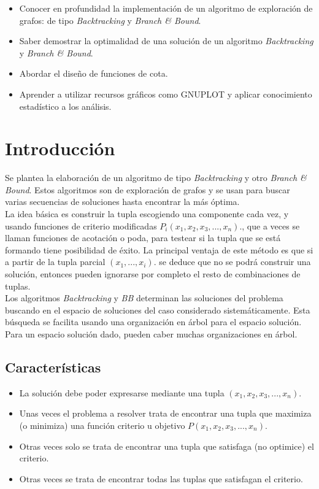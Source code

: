 \documentclass[a4paper,12pt,twoside]{article} %
\begin{document}
	\begin{itemize}
		\item Conocer en profundidad la implementación de un algoritmo de exploración de grafos: de tipo \textit{Backtracking} y \textit{Branch \& Bound}.
		\item Saber demostrar la optimalidad de una solución de un algoritmo \textit{Backtracking} y \textit{Branch \& Bound}.
		\item Abordar el diseño de funciones de cota.
		\item Aprender a utilizar recursos gráficos como GNUPLOT y aplicar conocimiento estadístico a los análisis.
	\end{itemize}
\newpage


\section{Introducción}

Se plantea la elaboración de un algoritmo de tipo \textit{Backtracking} y otro \textit{Branch \& Bound}. Estos algoritmos son de exploración de grafos y se usan para buscar varias secuencias de soluciones hasta encontrar la más óptima.\\

La idea básica es construir la tupla escogiendo
una componente cada vez, y usando funciones de criterio modificadas
$P_i(x_1,x_2,x_3,...,x_n)$., que a veces se llaman funciones de acotación o poda, para testear si la tupla que se está formando tiene posibilidad de éxito. La principal ventaja de este método es que si a partir de la tupla parcial $(x_1,...,x_i)$. se deduce que no se podrá construir una solución, entonces pueden ignorarse por completo el resto de combinaciones de tuplas.\\

Los algoritmos \textit{Backtracking} y \textit{BB} determinan las soluciones del problema buscando en el espacio de soluciones del caso considerado sistemáticamente. Esta búsqueda se facilita usando una organización en árbol para el espacio solución. Para un espacio solución dado, pueden caber muchas organizaciones en árbol. 

\subsection{Características}

\begin{itemize}
    \item La solución debe poder expresarse mediante una tupla $(x_1,x_2,x_3,...,x_n)$.
    \item Unas veces el problema a resolver trata de encontrar una tupla que maximiza (o minimiza) una función criterio u objetivo $P(x_1,x_2,x_3,...,x_n)$.
    \item Otras veces solo se trata de encontrar una tupla que satisfaga (no optimice) el criterio.
    \item Otras veces se trata de encontrar todas las tuplas que satisfagan el criterio.
\end{itemize} 
\end{document}
